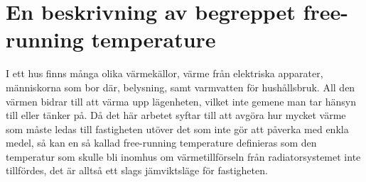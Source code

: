 \section{En beskrivning av begreppet free-running temperature}
\label{sec:freerunningtemp}

I ett hus finns många olika värmekällor, värme från elektriska apparater, människorna som bor där, belysning, samt varmvatten för hushållsbruk. All den värmen bidrar till att värma upp lägenheten, vilket inte gemene man tar hänsyn till eller tänker på. Då det här arbetet syftar till att avgöra hur mycket värme som måste ledas till fastigheten utöver det som inte gör att påverka med enkla medel, så kan en så kallad free-running temperature definieras som den temperatur som skulle bli inomhus om värmetillförseln från radiatorsystemet inte tillfördes, det är alltså ett slags jämviktsläge för fastigheten.

